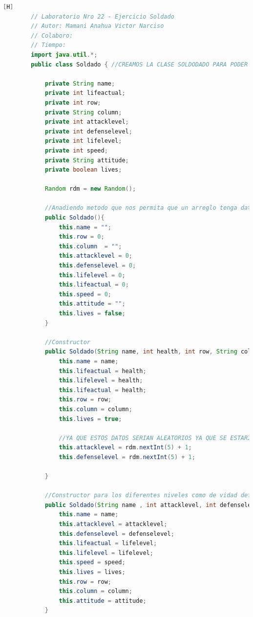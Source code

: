 \documentclass{article}
\begin{document}
	\begin{lstlisting}[language=java,caption={Las lineas de codigos de la clase Soldado creada:}][H]
		// Laboratorio Nro 22 - Ejercicio Soldado
		// Autor: Mamani Anahua Victor Narciso
		// Colaboro:
		// Tiempo:
		import java.util.*;
		public class Soldado { //CREAMOS LA CLASE SOLDODADO PARA PODER USAR UN ARREGLO BIDIMENSIONAL DONDE NECESITAMOS LA VIDA , EL NOMBRE DEL SOLDADO Y TAMBIEN SU POSICION COMO LA FILA Y LA COLUMNA   
		
			private String name;
			private int lifeactual;
			private int row;
			private String column;
			private int attacklevel;
			private int defenselevel;
			private int lifelevel;
			private int speed;
			private String attitude;
			private boolean lives;
		
			Random rdm = new Random();
		
			//Anadiendo metodo que nos permita que un arreglo tenga datos nulos si este esta vacio
			public Soldado(){
				this.name = "";
				this.row = 0;
				this.column  = "";
				this.attacklevel = 0;
				this.defenselevel = 0;
				this.lifelevel = 0;
				this.lifeactual = 0;
				this.speed = 0;
				this.attitude = "";
				this.lives = false;
			}
		
			//Constructor
			public Soldado(String name, int health, int row, String column){
				this.name = name;
				this.lifeactual = health;
				this.lifelevel = health;
				this.lifeactual = health;
				this.row = row;
				this.column = column;
				this.lives = true;
				
				//YA QUE ESTOS DATOS SERIAN ALEATORIOS YA QUE SE ESTARIA CREANDO EL SOLDADO TENDRIAMOS DATOS QUE SERIAN COMO ATTACKLEVEL DEFENSELEVEL EL CUAL TENDRIAN QUE SER ALEATORIOS    
				this.attacklevel = rdm.nextInt(5) + 1;
				this.defenselevel = rdm.nextInt(5) + 1;
		
			}
			
			//Constructor para los diferentes niveles como de vidad defensa ataque velocidad
			public Soldado(String name , int attacklevel, int defenselevel, int lifelevel, int speed, String attitude ,boolean lives, int row, String column) {
				this.name = name;
				this.attacklevel = attacklevel;
				this.defenselevel = defenselevel;
				this.lifeactual = lifelevel;
				this.lifelevel = lifelevel;
				this.speed = speed;
				this.lives = lives;
				this.row = row;
				this.column = column;
				this.attitude = attitude;
			}
		

\end{lstlisting}
\end{document}

